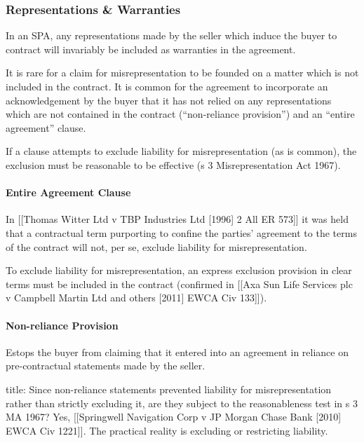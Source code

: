 \documentclass[
]{article}
\newenvironment{Shaded}{}{}
\newcommand{\NormalTok}[1]{#1}
\begin{document}
\hypertarget{representations-warranties}{%
\subsubsection{Representations \&
Warranties}\label{representations-warranties}}

In an SPA, any representations made by the seller which induce the buyer
to contract will invariably be included as warranties in the agreement.

It is rare for a claim for misrepresentation to be founded on a matter
which is not included in the contract. It is common for the agreement to
incorporate an acknowledgement by the buyer that it has not relied on
any representations which are not contained in the contract
(``non-reliance provision'') and an ``entire agreement'' clause.

If a clause attempts to exclude liability for misrepresentation (as is
common), the exclusion must be reasonable to be effective (s 3
Misrepresentation Act 1967).

\hypertarget{entire-agreement-clause}{%
\paragraph{Entire Agreement Clause}\label{entire-agreement-clause}}

In {[}{[}Thomas Witter Ltd v TBP Industries Ltd {[}1996{]} 2 All ER
573{]}{]} it was held that a contractual term purporting to confine the
parties' agreement to the terms of the contract will not, per se,
exclude liability for misrepresentation.

To exclude liability for misrepresentation, an express exclusion
provision in clear terms must be included in the contract (confirmed in
{[}{[}Axa Sun Life Services plc v Campbell Martin Ltd and others
{[}2011{]} EWCA Civ 133{]}{]}).

\hypertarget{non-reliance-provision}{%
\paragraph{Non-reliance Provision}\label{non-reliance-provision}}

Estops the buyer from claiming that it entered into an agreement in
reliance on pre-contractual statements made by the seller.

\begin{Shaded}
\begin{Highlighting}[]
\NormalTok{title: Since non{-}reliance statements prevented liability for misrepresentation rather than strictly excluding it, are they subject to the reasonableness test in s 3 MA 1967?}
\NormalTok{Yes, [[Springwell Navigation Corp v JP Morgan Chase Bank [2010] EWCA Civ 1221]]. The practical reality is excluding or restricting liability. }
\end{Highlighting}
\end{Shaded}
\end{document}
